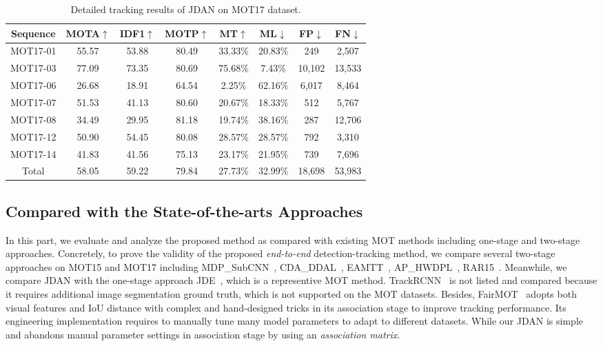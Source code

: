 \documentclass[acmsmall]{acmart}
\begin{document}
\setlength{\tabcolsep}{5pt}
\begin{table}
	\begin{center}
		\caption{
			Detailed tracking results of JDAN on MOT17 dataset.}
		\label{tab:mot17_detailed}
		\centering
		\setlength{\tabcolsep}{3.5pt}
		\begin{tabular}{c|ccccccc}
			\hline
			\hline
			Sequence & MOTA$\uparrow$ & IDF1$\uparrow$ & MOTP$\uparrow$ & MT$\uparrow$ & ML$\downarrow$ & FP$\downarrow$ & FN$\downarrow$\\
			\hline
			MOT17-01 & 55.57 & 53.88 & 80.49 & 33.33\% & 20.83\% & 249 & 2,507\\
			MOT17-03 & 77.09 & 73.35 & 80.69 & 75.68\% & 7.43\% & 10,102 & 13,533\\
			MOT17-06 & 26.68 & 18.91 & 64.54 & 2.25\% & 62.16\% & 6,017 & 8,464\\
			MOT17-07 & 51.53 & 41.13 & 80.60 & 20.67\% & 18.33\% & 512 & 5,767\\
			MOT17-08 & 34.49 & 29.95 & 81.18 & 19.74\% & 38.16\% & 287 & 12,706\\
			MOT17-12 & 50.90 & 54.45 & 80.08 & 28.57\% & 28.57\% & 792 & 3,310\\
			MOT17-14 & 41.83 & 41.56 & 75.13 & 23.17\% & 21.95\% & 739 & 7,696\\
			\hline
			Total & 58.05 & 59.22 & 79.84 & 27.73\% & 32.99\% & 18,698 & 53,983\\
			\hline
			\hline
		\end{tabular}
	\end{center}
\end{table}
\setlength{\tabcolsep}{1.4pt}



\subsection{Compared with the State-of-the-arts Approaches}
In this part, we evaluate and analyze the proposed method as compared with existing MOT methods including one-stage and two-stage approaches. 
%
Concretely, to prove the validity of the proposed \emph{end-to-end} detection-tracking method, we compare several two-stage approaches on MOT15 and MOT17 including MDP\_SubCNN~\cite{xiang2015learning}, CDA\_DDAL~\cite{bae2017confidence}, EAMTT~\cite{sanchez2016online}, AP\_HWDPL~\cite{chen2017online}, RAR15~\cite{fang2018recurrent}.
Meanwhile, we compare JDAN with the one-stage approach JDE~\cite{jde}, which is a representive MOT method.
TrackRCNN~\cite{voigtlaender2019mots} is not listed and compared because it requires additional image segmentation ground truth, which is not supported on the MOT datasets. 
{
Besides, FairMOT~\cite{fairmot} adopts both visual features and IoU distance with complex and hand-designed tricks in its association stage to improve tracking performance.
Its engineering implementation requires to manually tune many model parameters to adapt to different datasets.
While our JDAN is simple and abandons manual parameter settings in association stage by using an \emph{association matrix}.
}
\end{document}
